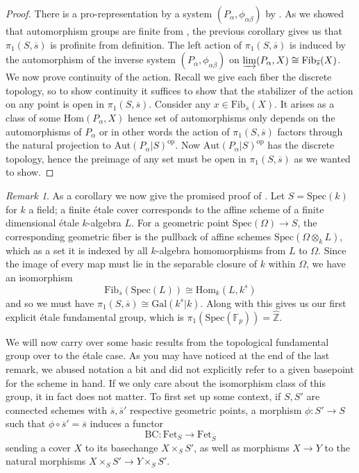 \documentclass{article}
\theoremstyle{definition}
\theoremstyle{remark}
\newtheorem*{remark}{Remark}
\theoremstyle{plain}
\newcommand{\Z}{\mathbb{Z}}
\begin{document}
\begin{proof}
	There is a pro-representation by a system $(P_{\alpha}, \phi_{\alpha \beta})$  by .
	As we showed that automorphism groups are finite from , the previous corollary gives us that $\pi_1(S, \overline{s})$ is profinite from definition.
	The left action of $\pi_1(S, \overline{s})$ is induced by the automorphism of the inverse system $(P_{\alpha}, \phi_{\alpha \beta})$ on $\varinjlim(P_{\alpha}, X) \cong \text{Fib}_{\overline{s}}(X)$.\\	
\indent 	We now prove continuity of the action.
Recall we give each fiber the discrete topology, so to show continuity it suffices to show that the stabilizer of the action on any point is open in $\pi_1(S, \overline{s})$.
	Consider any $x \in \text{Fib}_{\overline{s}}(X)$. 
	It arises as a class of some $\text{Hom}(P_{\alpha}, X)$ hence set of automorphisms only depends on the automorphisms of $P_{\alpha}$ or in other words the action of $\pi_1(S, \overline{s}) $ factors through the natural projection to $\text{Aut}(P_{\alpha}|S)^{\text{op}}$.
	Now $\text{Aut}(P_{\alpha}|S)^{\text{op}}$ has the discrete topology, hence the preimage of any set must be open in $\pi_1(S, \overline{s})$ as we wanted to show.
 \end{proof}

\begin{remark}


As a corollary we now give the promised proof of .
Let $S = \text{Spec}(k)$ for $k$ a field; a finite \'etale cover corresponds to the affine scheme of a finite dimensional \'etale $k$-algebra $L$.
For a geometric point $\text{Spec}(\Omega) \to S$, the corresponding geometric fiber is the pullback of affine schemes $\text{Spec}(\Omega \otimes_k L)$, which as a set it is indexed by all $k$-algebra homomorphisms from $L$ to $\Omega$.
Since the image of every map must lie in the separable closure of $k$ within $\Omega$, we have an isomorphism 
\[\text{Fib}_{\overline{s}}(\text{Spec}(L)) \cong \text{Hom}_k(L, k^s)\]
and so we must have $\pi_1(S, \overline{s}) \cong \text{Gal}(k^s|k)$.
Along with  this gives us our first explicit \'etale fundamental group, which is $\pi_1(\text{Spec}(\mathbb{F}_p)) = \widehat{\Z}$.
\end{remark}

	We will now carry over some basic results from the topological fundamental group over to the \'etale case.
As you may have noticed at the end of the last remark, we abused notation a bit and did not explicitly refer to a given basepoint for the scheme in hand.
If we only care about the isomorphism class of this group, it in fact does not matter.
	To first set up some context, if $S, S'$ are connected schemes with $\overline{s}, \overline{s}'$ respective geometric points, a morphism $\phi: S' \to S$ such that $\phi \circ \overline{s}' = \overline{s}$ induces a functor
\[\text{BC}: \text{Fet}_S \to \text{Fet}_{\overline{S}}\]
sending a cover $X$ to its basechange $X \times_S S'$, as well as morphisms $X \to Y$ to the natural morphisms $X \times_S S' \to Y \times_S S'$.
\end{document}
